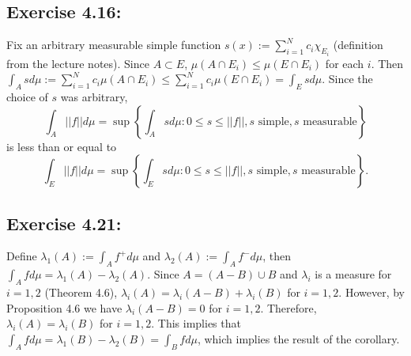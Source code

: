 \documentclass[11.5pt, letterpaper, bibtotoc,
    tablecaptionabove, figurecaptionabove]{article}
\begin{document}
\subsection*{Exercise 4.16:}\label{ex416}
Fix an arbitrary measurable simple function $s(x):=\sum_{i=1}^Nc_i\chi_{E_i}$ 
(definition from the lecture notes).
Since $A\subset E$, $\mu(A\cap E_i)\leq\mu(E\cap E_i)$ for each $i$.
Then $\int_Asd\mu:=\sum_{i=1}^Nc_i\mu(A\cap E_i)\leq\sum_{i=1}^Nc_i\mu(E\cap E_i) =\int_Esd\mu$.
Since the choice of $s$ was arbitrary, 
\begin{equation*}
    \int_A||f||d\mu=\sup\left\{\int_Asd\mu: 0\leq s\leq||f||, 
    s \text{ simple}, s \text{ measurable}\right\}
\end{equation*}
is less than or equal to
\begin{equation*}
    \int_E||f||d\mu=\sup\left\{\int_Esd\mu: 0\leq s\leq||f||,
    s \text{ simple}, s \text{ measurable}\right\}.
\end{equation*}

\subsection*{Exercise 4.21:}
Define $\lambda_1(A):=\int_Af^+d\mu$ and $\lambda_2(A):=\int_Af^-d\mu$,
then $\int_Afd\mu=\lambda_1(A)-\lambda_2(A)$.
Since $A=(A-B)\cup B$ and $\lambda_i$ is a measure for $i=1,2$ (Theorem 4.6), 
$\lambda_i(A)=\lambda_i(A-B)+\lambda_i(B)$ for $i=1,2$.
However, by Proposition 4.6 we have $\lambda_i(A-B)=0$ for $i=1,2$.
Therefore, $\lambda_i(A)=\lambda_i(B)$ for $i=1,2$.
This implies that $\int_Afd\mu=\lambda_1(B)-\lambda_2(B)=\int_Bfd\mu$,
which implies the result of the corollary.
\end{document}
